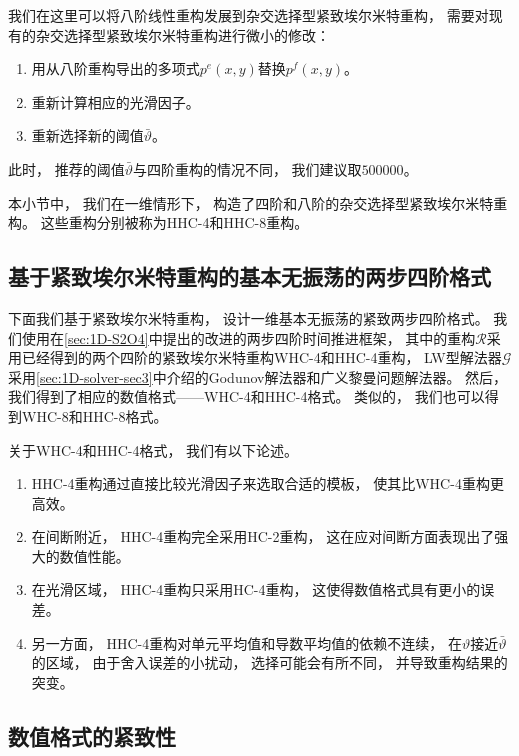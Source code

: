 我们在这里可以将八阶线性重构发展到杂交选择型紧致埃尔米特重构，
需要对现有的杂交选择型紧致埃尔米特重构进行微小的修改：
\begin{enumerate}
  \item 用从八阶重构导出的多项式$p^{{e}}(x,y)$替换$p^{{f}}(x,y)$。
  \item 重新计算相应的光滑因子。
  \item 重新选择新的阈值$\bar\vartheta$。
\end{enumerate}
此时，
推荐的阈值$\bar\vartheta$与四阶重构的情况不同，
我们建议取$500000$。

\vspace{0.5\baselineskip} %
本小节中，
我们在一维情形下，
构造了四阶和八阶的杂交选择型紧致埃尔米特重构。
这些重构分别被称为HHC-4和HHC-8重构。

\subsection{基于紧致埃尔米特重构的基本无振荡的两步四阶格式}

下面我们基于紧致埃尔米特重构，
设计一维基本无振荡的紧致两步四阶格式。
我们使用在\cref{sec:1D-S2O4}中提出的改进的两步四阶时间推进框架，
其中的重构$\mathcal{R}$采用已经得到的两个四阶的紧致埃尔米特重构WHC-4和HHC-4重构，
LW型解法器$\mathcal{G}$采用\cref{sec:1D-solver-sec3}中介绍的Godunov解法器和广义黎曼问题解法器。
然后，
我们得到了相应的数值格式——WHC-4和HHC-4格式。
类似的，
我们也可以得到WHC-8和HHC-8格式。

关于WHC-4和HHC-4格式，
我们有以下论述。
\begin{enumerate}
  \item HHC-4重构通过直接比较光滑因子来选取合适的模板，
        使其比WHC-4重构更高效。
  \item 在间断附近，
        HHC-4重构完全采用HC-2重构，
        这在应对间断方面表现出了强大的数值性能。
  \item 在光滑区域，
        HHC-4重构只采用HC-4重构，
        这使得数值格式具有更小的误差。
  \item 另一方面，
        HHC-4重构对单元平均值和导数平均值的依赖不连续，
        在$\vartheta$接近$\bar\vartheta$的区域，
        由于舍入误差的小扰动，
        选择可能会有所不同，
        并导致重构结果的突变。
\end{enumerate}

\subsection{数值格式的紧致性}

